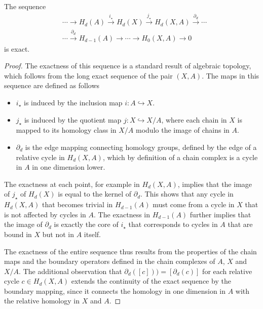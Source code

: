 \begin{proposition}{\cite[p.117f]{hatcher2005algebraic}}
	The sequence
	\begin{align}
		&\cdots \rightarrow H_{d}(A) \xrightarrow{i_\star}H_{d}(X) \xrightarrow{j_\star}
		H_{d}(X,A) \xrightarrow{\partial_d} \cdots \\
		&\cdots \xrightarrow{\partial_d} H_{d-1}(A) \rightarrow \cdots \rightarrow
		H_{0}(X,A) \rightarrow 0
	\end{align}
	is exact.
\end{proposition}

\begin{proof}
The exactness of this sequence is a standard result of algebraic topology, which follows from the long exact sequence of the pair \((X, A)\). The maps in this sequence are defined as follows
\begin{itemize}
    \item \(i_{\star}\) is induced by the inclusion map \(i: A \hookrightarrow X\).
    \item \(j_{\star}\) is induced by the quotient map \(j: X \hookrightarrow X/A\), where each chain in \(X\) is mapped to its homology class in \(X/A\) modulo the image of chains in \(A\).
    \item \(\partial_{d}\) is the edge mapping connecting homology groups, defined by the edge of a relative cycle in \(H_{d}(X, A)\), which by definition of a chain complex is a cycle in \(A\) in one dimension lower.
\end{itemize}

The exactness at each point, for example in \(H_{d}(X, A)\), implies that the image of \(j_{\star}\) of \(H_{d}(X)\) is equal to the kernel of \(\partial_{d}\). This shows that any cycle in \(H_{d}(X, A)\) that becomes trivial in \(H_{d-1}(A)\) must come from a cycle in \(X\) that is not affected by cycles in \(A\). The exactness in \(H_{d-1}(A)\) further implies that the image of \(\partial_{d}\) is exactly the core of \(i_{\star}\) that corresponds to cycles in \(A\) that are bound in \(X\) but not in \(A\) itself.

The exactness of the entire sequence thus results from the properties of the chain maps and the boundary operators defined in the chain complexes of \(A\), \(X\) and \(X/A\). The additional observation that \(\partial_{d}([c])) = [\partial_{d}(c)]\) for each relative cycle \(c \in H_{d}(X, A)\) extends the continuity of the exact sequence by the boundary mapping, since it connects the homology in one dimension in \(A\) with the relative homology in \(X\) and \(A\).
\end{proof}


